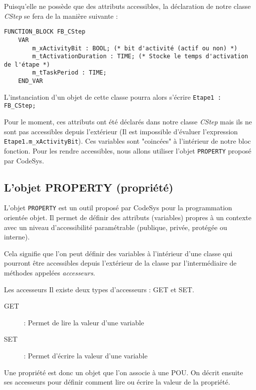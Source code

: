 \begin{UPSTIidee}{}
    Puisqu'elle ne possède que des attributs accessibles, la déclaration de notre classe \emph{CStep} se fera de la manière suivante :
    \begin{lstlisting}
FUNCTION_BLOCK FB_CStep
    VAR
        m_xActivityBit : BOOL; (* bit d'activité (actif ou non) *)
        m_tActivationDuration : TIME; (* Stocke le temps d'activation de l'étape *)
        m_tTaskPeriod : TIME; 
    END_VAR\end{lstlisting}

    L'instanciation d'un objet de cette classe pourra alors s'écrire \lstinline{Etape1 : FB_CStep;}

    Pour le moment, ces attributs ont été déclarés dans notre classe \emph{CStep} mais ils ne sont pas accessibles depuis l'extérieur (Il est impossible d'évaluer l'expression \lstinline{Etape1.m_xActivityBit}). Ces variables sont "coincées" à l'intérieur de notre bloc fonction. Pour les rendre accessibles, nous allons utiliser l'objet \lstinline{PROPERTY} proposé par CodeSys. 
\end{UPSTIidee}

\subsection{L'objet PROPERTY (propriété)}
L'objet \lstinline{PROPERTY} est un outil proposé par CodeSys pour la programmation orientée objet. Il permet de définir des attributs (variables) propres à un contexte avec un niveau d'accessibilité paramétrable (publique, privée, protégée ou interne).

Cela signifie que l'on peut définir des variables à l'intérieur d'une classe qui pourront être accessibles depuis l'extérieur de la classe par l'intermédiaire de méthodes appelées \emph{accesseurs}.

\begin{UPSTIinfor}{Les accesseurs}
    Il existe deux types d'accesseurs : GET et SET. 
    \begin{description}
        \item[GET] : Permet de lire la valeur d'une variable
        \item[SET] : Permet d'écrire la valeur d'une variable
    \end{description}
\end{UPSTIinfor}

Une propriété est donc un objet que l'on associe à une POU. On décrit ensuite ses accesseurs pour définir comment lire ou écrire la valeur de la propriété.

